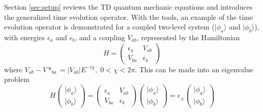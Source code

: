 \documentclass{article}
\begin{document}
Section \ref{sec:setup} reviews the TD quantum mechanic equations and introduces the
generalized time evolution operator. With the tools, an example of the time evolution
operator is demonstrated for a coupled two-level system ($|\phi_a\rangle$ and $|\phi_b\rangle$),
with energies $\epsilon_a$ and $\epsilon_b$, and a coupling $V_{ab}$, represented by the
Hamiltonian
\begin{equation}
  H =
  \begin{pmatrix}
    \epsilon_a & V_{ab} \\
    V_{ba} & \epsilon_b
  \end{pmatrix}
  \label{eqn:two_level_H}
\end{equation}
where $V_{ab} - V*_{ba} = |V_{ab}|E^{-i\chi},\; 0 <\chi < 2\pi$. This can be made into
an eigenvalue problem
\begin{equation}
  H\begin{pmatrix}
  |\phi_a\rangle \\
  |\phi_b\rangle
  \end{pmatrix}
  =
  \begin{pmatrix}
    \epsilon_a & V_{ab} \\
    V_{ba} & \epsilon_b
  \end{pmatrix}
  \begin{pmatrix}
  |\phi_a\rangle \\
  |\phi_b\rangle
  \end{pmatrix}
  =\epsilon_{\pm}
  \begin{pmatrix}
  |\phi_a\rangle \\
  |\phi_b\rangle
  \end{pmatrix}
\end{equation}
\end{document}
